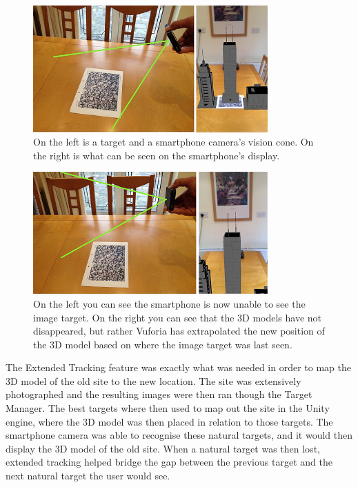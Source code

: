 \begin{figure}[ht!]
	\centering
	\includegraphics[width=90mm]{extended1}
	\caption{On the left is a target and a smartphone camera’s vision cone. On the right is what can be seen on the smartphone’s display.
		 \label{overflow}}
\end{figure}

\clearpage

\begin{figure}[ht!]
	\centering
	\includegraphics[width=90mm]{extended2}
	\caption{On the left you can see the smartphone is now unable to see the image target.
		On the right you can see that the 3D models have not disappeared, but rather Vuforia has extrapolated the new position of the 3D model based on where the image target was last seen.
		 \label{overflow}}
\end{figure}


The Extended Tracking feature was exactly what was needed in order to map the 3D model of the old site to the new location. The site was extensively photographed and the resulting images were then ran though the Target Manager. The best targets where then used to map out the site in the Unity engine, where the 3D model was then placed in relation to those targets. The smartphone camera was able to recognise these natural targets, and it would then display the 3D model of the old site. When a natural target was then lost, extended tracking helped bridge the gap between the previous target and the next natural target the user would see.


